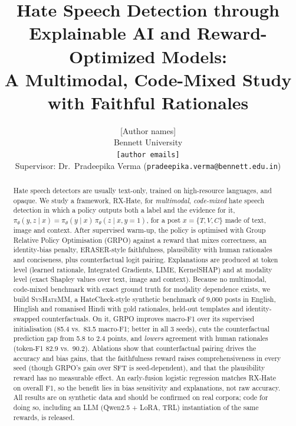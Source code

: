 \documentclass[11pt]{article}
\title{Hate Speech Detection through Explainable AI and Reward-Optimized Models:\\
A Multimodal, Code-Mixed Study with Faithful Rationales}
\author{[Author names]\\
Bennett University\\
\texttt{[author emails]}\\[2pt]
{\normalsize Supervisor: Dr.\ Pradeepika Verma (\texttt{pradeepika.verma@bennett.edu.in})}}
\newcommand{\pihat}{\pi_\theta}
\newcommand{\RX}{RX-Hate}
\begin{document}
\maketitle

\begin{abstract}
Hate speech detectors are usually text-only, trained on high-resource languages, and opaque. We study a
framework, \RX{}, for \emph{multimodal}, \emph{code-mixed} hate speech detection in which a policy outputs both a
label and the evidence for it, $\pihat(y,z\mid x)=\pihat(y\mid x)\,\pihat(z\mid x,y{=}1)$, for a post
$x=\{T,V,C\}$ made of text, image and context. After supervised warm-up, the policy is optimised with Group Relative Policy Optimisation (GRPO)
against a reward that mixes correctness, an identity-bias penalty, ERASER-style faithfulness, plausibility with
human rationales and conciseness, plus counterfactual logit pairing. Explanations are produced at token level
(learned rationale, Integrated Gradients, LIME, KernelSHAP) and at modality level (exact Shapley values over text, image and
context). Because no multimodal, code-mixed benchmark with exact ground truth for modality dependence exists, we build
\textsc{SynHateMM}, a HateCheck-style synthetic benchmark of 9{,}000 posts in English, Hinglish and romanised Hindi with
gold rationales, held-out templates and identity-swapped counterfactuals. On it, GRPO improves macro-F1 over its supervised
initialisation (85.4 vs.\ 83.5 macro-F1; better in all 3 seeds), cuts the counterfactual prediction gap from 5.8 to 2.4 points,
and \emph{lowers} agreement with human rationales (token-F1 82.9 vs.\ 90.2). Ablations show that counterfactual pairing
drives the accuracy and bias gains, that the faithfulness reward raises comprehensiveness in every seed (though GRPO's gain over SFT is
seed-dependent), and that the plausibility reward has no measurable effect. An early-fusion
logistic regression matches \RX{} on overall F1, so the benefit lies in bias sensitivity and explanations, not raw accuracy. All results are
on synthetic data and should be confirmed on real corpora; code for doing so, including an LLM (Qwen2.5 + LoRA, TRL) instantiation of the same rewards, is released.
\end{abstract}

\end{document}
